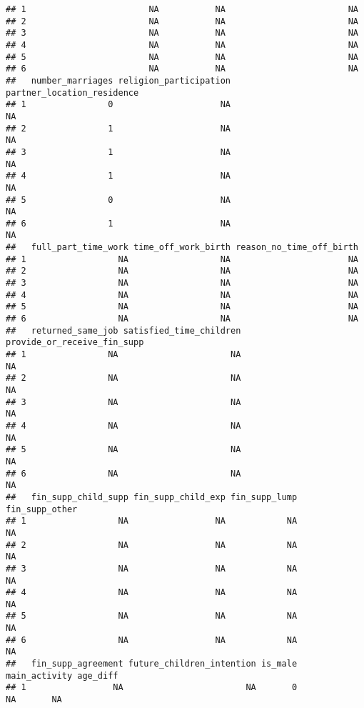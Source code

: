 \documentclass[
]{article}
\begin{document}
\begin{verbatim}
## 1                        NA           NA                        NA
## 2                        NA           NA                        NA
## 3                        NA           NA                        NA
## 4                        NA           NA                        NA
## 5                        NA           NA                        NA
## 6                        NA           NA                        NA
##   number_marriages religion_participation partner_location_residence
## 1                0                     NA                         NA
## 2                1                     NA                         NA
## 3                1                     NA                         NA
## 4                1                     NA                         NA
## 5                0                     NA                         NA
## 6                1                     NA                         NA
##   full_part_time_work time_off_work_birth reason_no_time_off_birth
## 1                  NA                  NA                       NA
## 2                  NA                  NA                       NA
## 3                  NA                  NA                       NA
## 4                  NA                  NA                       NA
## 5                  NA                  NA                       NA
## 6                  NA                  NA                       NA
##   returned_same_job satisfied_time_children provide_or_receive_fin_supp
## 1                NA                      NA                          NA
## 2                NA                      NA                          NA
## 3                NA                      NA                          NA
## 4                NA                      NA                          NA
## 5                NA                      NA                          NA
## 6                NA                      NA                          NA
##   fin_supp_child_supp fin_supp_child_exp fin_supp_lump fin_supp_other
## 1                  NA                 NA            NA             NA
## 2                  NA                 NA            NA             NA
## 3                  NA                 NA            NA             NA
## 4                  NA                 NA            NA             NA
## 5                  NA                 NA            NA             NA
## 6                  NA                 NA            NA             NA
##   fin_supp_agreement future_children_intention is_male main_activity age_diff
## 1                 NA                        NA       0            NA       NA

\end{verbatim}
\end{document}
